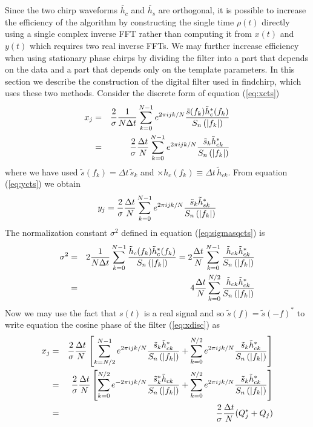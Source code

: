 Since the two chirp waveforms $\tilde{h_c}$ and $\tilde{h_s}$ are 
orthogonal, it is possible to increase the efficiency of the algorithm by
constructing the single time $\rho(t)$ directly using a single complex inverse
FFT rather than computing it from $x(t)$ and $y(t)$ which requires two real
inverse FFTs. We may further increase efficiency when using stationary phase
chirps by dividing the filter into a part that depends on the data and a part
that depends only on the template parameters. In this section we describe the
construction of the digital filter used in findchirp, which uses these two 
methods. Consider the discrete form of equation (\ref{eq:xcts})
\begin{eqnarray}
\label{eq:xdisc}
x_j &=& \frac{2}{\sigma} \frac{1}{N\Delta t} \sum_{k=0}^{N-1} e^{2\pi ijk/N} 
\frac{\tilde{s}(f_k) \tilde{h}_{c}^\ast(f_k)}{S_n\left(\left|f_{k}\right|\right)} \\
&=&
\frac{2}{\sigma} \frac{\Delta t}{N} \sum_{k=0}^{N-1} e^{2\pi ijk/N} 
\frac{\tilde{s}_k \tilde{h}_{ck}^\ast} {S_n\left(\left|f_{k}\right|\right)}
\end{eqnarray}
where we have used $\tilde{s}(f_k) = \Delta t\, \tilde{s}_k$ and
$\times{h}_c(f_k) \equiv \Delta t\, \tilde{h}_{ck}$. From equation
(\ref{eq:ycts}) we obtain
\begin{equation}
\label{eq:ydisc}
y_j = \frac{2}{\sigma} \frac{\Delta t}{N} \sum_{k=0}^{N-1} e^{2\pi ijk/N} 
\frac{\tilde{s}_k \tilde{h}_{sk}^\ast} {S_n\left(\left|f_{k}\right|\right)}
\end{equation}
The normalization constant $\sigma^2$ defined in equation
(\ref{eq:sigmasqcts}) is
\begin{eqnarray}
\label{eq:sigmasqdisc}
\sigma^2 &=& 2 \frac{1}{N\Delta t} \sum_{k=0}^{N-1}
\frac{\tilde{h}_{c}(f_k)\tilde{h}_{c}^\ast(f_k)}{S_n\left(\left|f_{k}\right|\right)} 
=
2 \frac{\Delta t}{N} \sum_{k=0}^{N-1}
\frac{\tilde{h}_{ck}\tilde{h}_{ck}^\ast}{S_n\left(\left|f_{k}\right|\right)} \\
&=&
4 \frac{\Delta t}{N} \sum_{k=0}^{N/2}
\frac{\tilde{h}_{ck}\tilde{h}_{ck}^\ast}{S_n\left(\left|f_{k}\right|\right)}
\end{eqnarray}
Now we may use the fact that $s(t)$ is a real signal and so $\tilde{s}(f) = 
\tilde{s}(-f)^\ast$ to write equation the cosine phase of the filter 
(\ref{eq:xdisc}) as
\begin{eqnarray}
x_j &=& 
\frac{2}{\sigma}\frac{\Delta t}{N}
\left[
  \sum_{k=N/2}^{N-1} e^{2\pi ijk/N} 
  \frac{\tilde{s}_k \tilde{h}_{ck}^\ast}{S_n\left(\left|f_{k}\right|\right)}
  +
  \sum_{k=0}^{N/2} e^{2\pi ijk/N} 
  \frac{\tilde{s}_k \tilde{h}_{ck}^\ast}{S_n\left(\left|f_{k}\right|\right)}
\right] \\
&=& 
\frac{2}{\sigma}\frac{\Delta t}{N}
\left[
  \sum_{k=0}^{N/2} e^{-2\pi ijk/N} 
  \frac{\tilde{s}_k^\ast \tilde{h}_{ck}}{S_n\left(\left|f_{k}\right|\right)}
  +
  \sum_{k=0}^{N/2} e^{2\pi ijk/N} 
  \frac{\tilde{s}_k \tilde{h}_{ck}^\ast}{S_n\left(\left|f_{k}\right|\right)}
\right] \\
&=&
\frac{2}{\sigma}\frac{\Delta t}{N}(Q_j^\ast + Q_j)
\end{eqnarray}
